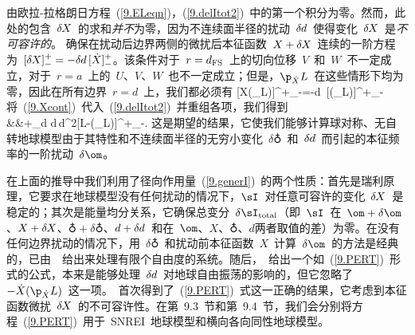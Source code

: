 由欧拉-拉格朗日方程~(\ref{9.ELeqn})，(\ref{9.delItot2})~中的第一个积分为零。然而，此处的包含~$\delta\hspace{-0.2 mm}X$~的求和{\em 并不\/}为零，因为不连续面半径的扰动~$\delta\hspace{-0.1 mm}d$~使得变化~$\delta\hspace{-0.2 mm}X$~是{\em 不可容许的\/}。
%
确保在扰动后边界两侧的微扰后本征函数~$X+\delta\hspace{-0.2 mm}X$~连续的一阶方程为~$[\delta\hspace{-0.2 mm}X]^+_-=
-\delta\hspace{-0.1 mm}d\,[\dot{X}]^+_-$。该条件对于~$r=d_{\rm FS}$~上的切向位移~$V$~和~$W$~不一定成立，对于~$r=a$~上的~$U$、$V$、$W$~也不一定成立；但是，$\p_{\dot{X}}L$~在这些情形下均为零，因此在所有边界~$r=d$~上，我们都必须有
\eq \label{9.Xcont}
[\delta X\hspace{0.3 mm}(\p_{}L)]^+_-=-\delta\hspace{-0.1 mm}d\,
[\hspace{0.3 mm}(\p_{}L)]^+_-
\en
将~(\ref{9.Xcont})~代入~(\ref{9.delItot2})~并重组各项，我们得到
\eqa
\label{9.PERT}  \nonumber \\
&&\mbox{}+\sum_d\delta\hspace{-0.1 mm}
d\,d^2[L-(\p_{}L)]^+_-.
\ena
这是期望的结果，它使我们能够计算球对称、无自转地球模型由于其特性和不连续面半径的无穷小变化~$\delta\earth$~和~$\delta\hspace{-0.1 mm}d$~而引起的本征频率的一阶扰动~$\delta\om$。

在上面的推导中我们利用了径向作用量~(\ref{9.generI})~的两个性质：首先是瑞利原理，它要求在地球模型没有任何扰动的情况下，$\sI$~对任意可容许的变化~$\delta\hspace{-0.2 mm}X$~是稳定的；其次是能量均分关系，它确保总变分~$\delta\sI_{\rm total}$\hspace{0.2 mm}（即\hspace{0.2 mm}~$\sI$~在~$\om+\delta\om$、$X+\delta\hspace{-0.2 mm}X$、$\earth+\delta\earth$、$d+\delta\hspace{-0.1 mm}d$~和在~$\om$、$X$、$\earth$、$d$\hspace{0.2 mm}两者取值的差）为零。在没有任何边界扰动的情况下，用~$\delta\earth$~和扰动前本征函数~$X$~计算~$\delta\om$~的方法是经典的，已由~\textcite{rayleigh77}~给出来处理有限个自由度的系统。随后，\textcite{backus&gilbert67}~给出一个如~(\ref{9.PERT})~形式的公式，本来是能够处理~$\delta\hspace{-0.1 mm}d$~对地球自由振荡的影响的，但它忽略了~$-\dot{X}(\p_{\dot{X}}L)$~这一项。\textcite{woodhouse76}~首次得到了~(\ref{9.PERT})~式这一正确的结果，它考虑到本征函数微扰~$\delta\hspace{-0.2 mm}X$~的不可容许性。在第~9.3~节和第~9.4~节，我们会分别将方程~(\ref{9.PERT})~用于~SNREI~地球模型和横向各向同性地球模型。
%


